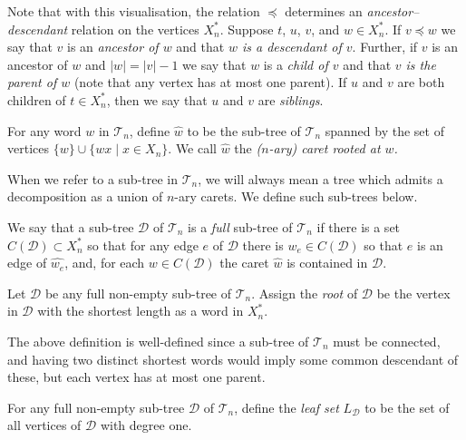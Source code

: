 \documentclass[12pt]{amsart}
\newcommand{\wh}[1]{\widehat{#1}}
\newcommand{\T}{\mathcal{T}}
\newcommand{\tn}{\T_n}
\newcommand{\D}{\mathcal{D}}
\newcommand{\xn}{X_n}
\newcommand{\xns}{X_n^*}
\begin{document}
    Note that with this visualisation, the relation $\preceq$ determines an \emph{ancestor--descendant} relation on the vertices $\xns$.  Suppose $t$, $u$, $v$, and $w\in \xns$.  If $v\preceq w$ we say that $v$ is an \emph{ancestor of $w$} and that \emph{$w$ is a descendant of $v$}.  Further, if $v$ is an ancestor of $w$ and $|w|=|v| - 1$ we say that $w$ is a \emph{child of $v$} and that \emph{$v$ is the parent of $w$} (note that any vertex has at most one parent).  If $u$ and $v$ are both children of $t\in\xns$, then we say that $u$ and $v$ are \emph{siblings}.    
        
        
            \begin{definition}[Caret]
            For any word $ w $ in $\tn$, define $\wh{ w }$ to be the sub-tree of $\tn$ spanned by the set of vertices $ \{w\}\cup\{wx\mid x\in\xn\}$. We call $\wh{w}$ the \textit{($n$-ary) caret rooted at $ w $.}
            \end{definition}



When we refer to a sub-tree in $\tn$, we will always mean a tree which admits a decomposition as a union of $n$-ary carets.  We define such sub-trees below.

\begin{definition} We say that a sub-tree $\mathcal{D}$ of $\tn$ is a \textit{full} sub-tree of $\tn$ if there is a set $C(\mathcal{D})\subset\xns$ so that for any edge $e$ of $\mathcal{D}$ there is $w_e\in C(\mathcal{D})$ so that $e$ is an edge of $\wh{w_e}$, and, for each $w\in C(\mathcal{D})$ the caret $\wh{w}$ is contained in $\mathcal{D}$.
\end{definition}

        
        \begin{definition}\label{def:root}
            Let $\D$ be any full non-empty sub-tree of $\tn$. Assign the \textit{root} of $\D$ be the vertex in $\D$ with the shortest length as a word in $\xns$.
        \end{definition}
            The above definition is well-defined since a sub-tree of $\tn$ must be connected, and having two distinct shortest words would imply some common descendant of these, but each vertex has at most one parent.
                    
        
        \begin{definition}
            For any full non-empty sub-tree $\D$ of $\tn$, define the \textit{leaf set} $L_\D$ to be the set of all vertices of $\D$ with degree one.
        \end{definition}
        
\end{document}

